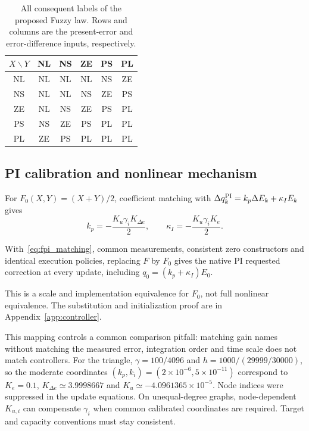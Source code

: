 \begin{table}[t]
\caption{All consequent labels of the proposed Fuzzy law. Rows and columns
are the present-error and error-difference inputs, respectively.}
\label{tab:fpi_full_rules}
\centering
\begin{tabular}{@{}c|ccccc@{}}\toprule
$X\backslash Y$ & NL & NS & ZE & PS & PL\\\midrule
NL & NL & NL & NL & NS & ZE\\
NS & NL & NL & NS & ZE & PS\\
ZE & NL & NS & ZE & PS & PL\\
PS & NS & ZE & PS & PL & PL\\
PL & ZE & PS & PL & PL & PL\\\bottomrule
\end{tabular}
\end{table}

\subsection{PI calibration and nonlinear mechanism}
\label{subsec:fpi_calibration}
For $F_0(X,Y)=(X+Y)/2$, coefficient matching with
$\Delta q_k^{\rm PI}=k_p\Delta E_k+\kappa_I E_k$ gives
\begin{equation}
 k_p=-\frac{K_u\gamma_iK_{\Delta e}}2,\qquad
 \kappa_I=-\frac{K_u\gamma_iK_e}2.
 \label{eq:fpi_matching}
\end{equation}
\begin{btdproposition}
\label{prop:fpi_equivalence}
With~\eqref{eq:fpi_matching}, common measurements, consistent zero
constructors and identical execution policies, replacing $F$ by $F_0$
gives the native PI requested correction at every update, including
$q_0=(k_p+\kappa_I)E_0$.
\end{btdproposition}
This is a scale and implementation equivalence for $F_0$, not full
nonlinear equivalence. The substitution and initialization proof are
in Appendix~\ref{app:controller}.

This mapping controls a common comparison pitfall: matching gain names
without matching the measured error, integration order and time scale
does not match controllers. For the triangle, $\gamma=100/4096$ and
$h=1000/(29999/30000)$, so the moderate coordinates
$(k_p,k_i)=(2\times10^{-6},5\times10^{-11})$ correspond to
$K_e=0.1$, $K_{\Delta e}\simeq3.9998667$ and
$K_u\simeq-4.0961365\times10^{-5}$. Node indices were suppressed
in the update equations. On unequal-degree graphs, node-dependent
$K_{u,i}$ can compensate $\gamma_i$ when common calibrated coordinates
are required. Target and capacity conventions must stay consistent.

